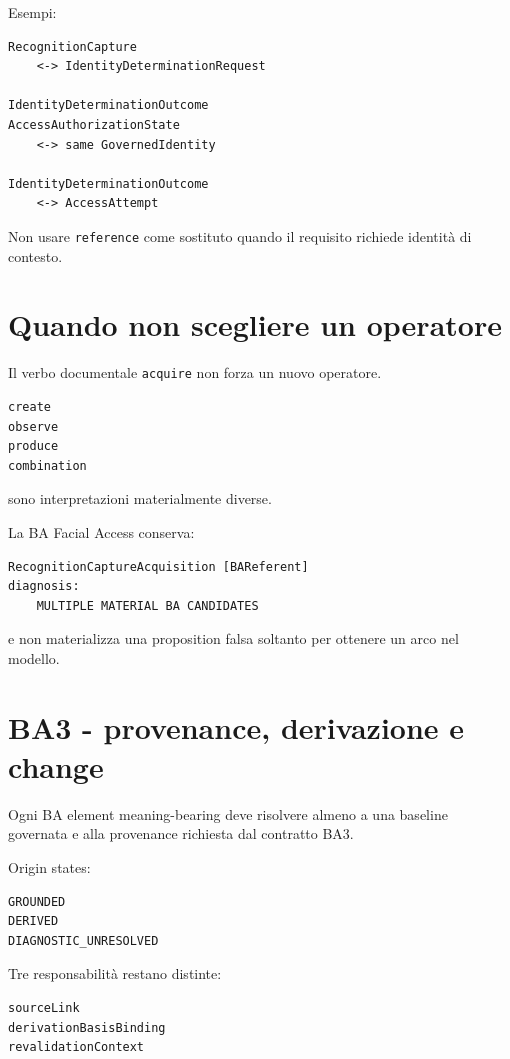 \documentclass[11pt,a4paper]{article}
\newcommand{\code}[1]{\nolinkurl{#1}}
\begin{document}
Esempi:

\begin{lstlisting}
RecognitionCapture
    <-> IdentityDeterminationRequest

IdentityDeterminationOutcome
AccessAuthorizationState
    <-> same GovernedIdentity

IdentityDeterminationOutcome
    <-> AccessAttempt
\end{lstlisting}

Non usare \code{reference} come sostituto quando il requisito richiede identità di contesto.

\section{Quando non scegliere un operatore}

Il verbo documentale \code{acquire} non forza un nuovo operatore.

\begin{lstlisting}
create
observe
produce
combination
\end{lstlisting}

sono interpretazioni materialmente diverse.

La BA Facial Access conserva:

\begin{lstlisting}
RecognitionCaptureAcquisition [BAReferent]
diagnosis:
    MULTIPLE MATERIAL BA CANDIDATES
\end{lstlisting}

e non materializza una proposition falsa soltanto per ottenere un arco nel modello.

\section{BA3 - provenance, derivazione e change}

Ogni BA element meaning-bearing deve risolvere almeno a una baseline governata e alla provenance richiesta dal contratto BA3.

Origin states:

\begin{lstlisting}
GROUNDED
DERIVED
DIAGNOSTIC_UNRESOLVED
\end{lstlisting}

Tre responsabilità restano distinte:

\begin{lstlisting}
sourceLink
derivationBasisBinding
revalidationContext
\end{lstlisting}
\end{document}
